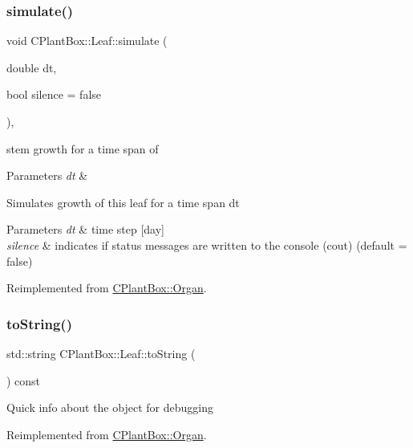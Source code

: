 \subsubsection{\texorpdfstring{simulate()}{simulate()}}
{\footnotesize\ttfamily void C\+Plant\+Box\+::\+Leaf\+::simulate (\begin{DoxyParamCaption}\item[{double}]{dt,  }\item[{bool}]{silence = {\ttfamily false} }\end{DoxyParamCaption})\hspace{0.3cm}{\ttfamily [override]}, {\ttfamily [virtual]}}



stem growth for a time span of 


\begin{DoxyParams}{Parameters}
{\em dt} & \\
\hline
\end{DoxyParams}
Simulates growth of this leaf for a time span dt


\begin{DoxyParams}{Parameters}
{\em dt} & time step \mbox{[}day\mbox{]} \\
\hline
{\em silence} & indicates if status messages are written to the console (cout) (default = false) \\
\hline
\end{DoxyParams}


Reimplemented from \hyperlink{classCPlantBox_1_1Organ_acf519fc6730c0adbb2a82b7702ff7a28}{C\+Plant\+Box\+::\+Organ}.

\mbox{\label{classCPlantBox_1_1Leaf_a7c09270825fa8f874dcf409969dbb554}} 
\subsubsection{\texorpdfstring{to\+String()}{toString()}}
{\footnotesize\ttfamily std\+::string C\+Plant\+Box\+::\+Leaf\+::to\+String (\begin{DoxyParamCaption}{ }\end{DoxyParamCaption}) const\hspace{0.3cm}{\ttfamily [virtual]}}

Quick info about the object for debugging 

Reimplemented from \hyperlink{classCPlantBox_1_1Organ_a9f823aebd19519096e899e65604f239f}{C\+Plant\+Box\+::\+Organ}.

